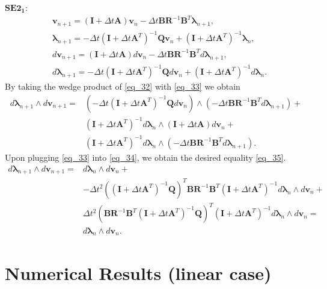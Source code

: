 \documentclass[a4paper, 10pt]{article}
\newcommand{\SEto}{SE2_1}
\begin{document}
$\bm{\SEto:}$
\begin{align}
    &  \bm{v}_{n+1} = (\bm{I} + \Delta{t}\bm{A}) \bm{v}_{n} - \Delta{t}\bm{B}\bm{R}^{-1}\bm{B}^{T}\bm{\lambda}_{n+1}, \label{eq_30} \\
    & \bm{\lambda}_{n+1} = -\Delta{t}(\bm{I}+\Delta{t}\bm{A}^{T})^{-1}\bm{Q}\bm{v}_{n} +(\bm{I} + \Delta{t}\bm{A}^{T})^{-1}\bm{\lambda}_{n}, \label{eq_31} \\
    & d\bm{v}_{n+1} = (\bm{I} + \Delta{t}\bm{A}) d\bm{v}_{n} - \Delta{t}\bm{B}\bm{R}^{-1}\bm{B}^{T}d\bm{\lambda}_{n+1}, \label{eq_32} \\
    & d\bm{\lambda}_{n+1} = -\Delta{t}(\bm{I}+\Delta{t}\bm{A}^{T})^{-1}\bm{Q}d\bm{v}_{n} +(\bm{I} + \Delta{t}\bm{A}^{T})^{-1}d\bm{\lambda}_{n}. \label{eq_33}
\end{align}
By taking the wedge product of \eqref{eq_32} with \eqref{eq_33} we obtain
\begin{align}
    d\bm{\lambda}_{n+1} \wedge     d\bm{v}_{n+1} = &  \left(-\Delta{t}(\bm{I}+\Delta{t}\bm{A}^{T})^{-1}\bm{Q}d\bm{v}_{n}\right) \wedge  \left(- \Delta{t}\bm{B}\bm{R}^{-1}\bm{B}^{T}d\bm{\lambda}_{n+1} \right) + \nonumber \\
    & (\bm{I} + \Delta{t}\bm{A}^{T})^{-1}d\bm{\lambda}_{n} \wedge (\bm{I} + \Delta{t}\bm{A})d\bm{v}_{n} + \nonumber \\
    & (\bm{I} + \Delta{t}\bm{A}^{T})^{-1}d\bm{\lambda}_{n} \wedge \left(-\Delta{t}\bm{B}\bm{R}^{-1}\bm{B}^{T}d\bm{\lambda}_{n+1}\right). \label{eq_34}
\end{align}
Upon plugging \eqref{eq_33} into \eqref{eq_34}, we obtain the desired equality \eqref{eq_35}.
\begin{align}
       d\bm{\lambda}_{n+1} \wedge     d\bm{v}_{n+1}  = & d\bm{\lambda}_{n} \wedge d\bm{v}_{n} + \nonumber \\
       & -\Delta{t}^2\left((\bm{I} + \Delta{t}\bm{A}^{T})^{-1}\bm{Q}\right)^{T}\bm{B}\bm{R}^{-1}\bm{B}^{T}(\bm{I} + \Delta{t}\bm{A}^{T})^{-1} d\bm{\lambda}_{n} \wedge d\bm{v}_{n}  + \nonumber \\
       & \Delta{t}^2 \left(\bm{B}\bm{R}^{-1}\bm{B}^{T}(\bm{I} + \Delta{t}\bm{A}^{T})^{-1}\bm{Q}\right)^{T} (\bm{I} + \Delta{t}\bm{A}^{T})^{-1} d\bm{\lambda}_{n} \wedge d\bm{v}_{n}  = \nonumber \\
       & d\bm{\lambda}_{n} \wedge d\bm{v}_{n}. \label{eq_35}
\end{align}

\section{Numerical Results (linear case)}
\end{document}
